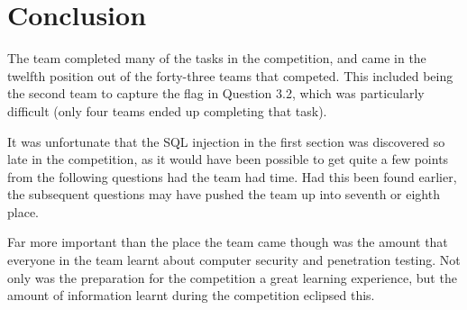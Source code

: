 \chapter{Conclusion}

The team completed many of the tasks in the competition, and came in the
twelfth position out of the forty-three teams that competed. This included
being the second team to capture the flag in Question 3.2, which was
particularly difficult (only four teams ended up completing that task).

It was unfortunate that the SQL injection in the first section was 
discovered so late in the competition, as it would have been possible to
get quite a few points from the following questions had the team had time.
Had this been found earlier, the subsequent questions may have pushed the team
up into seventh or eighth place.

Far more important than the place the team came though was the amount that
everyone in the team learnt about computer security and penetration testing.
Not only was the preparation for the competition a great learning experience,
but the amount of information learnt during the competition eclipsed this.



